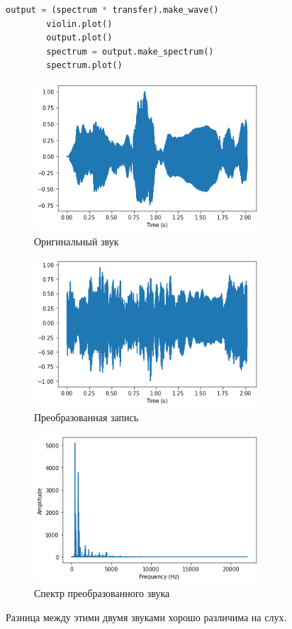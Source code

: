 \documentclass[a4paper, 12pt]{report}
\begin{document}
	\begin{lstlisting}[language=Python,caption=Вычисление выходного сигнала]
		output = (spectrum * transfer).make_wave()
		violin.plot()
		output.plot()
		spectrum = output.make_spectrum()
		spectrum.plot()
	\end{lstlisting}
	\begin{figure}[H]
		\centering
		\includegraphics[width=0.75\textwidth]{shot6.png}
		\caption{Оригинальный звук}
		\label{fig:shot6}
	\end{figure}
	\begin{figure}[H]
		\centering
		\includegraphics[width=0.75\textwidth]{shot7.png}
		\caption{Преобразованная запись}
		\label{fig:shot7}
	\end{figure}
	\begin{figure}[H]
		\centering
		\includegraphics[width=0.75\textwidth]{shot8.png}
		\caption{Спектр преобразованного звука}
		\label{fig:shot8}
	\end{figure}
	Разница между этими двумя звуками хорошо различима на слух.
\end{document}

